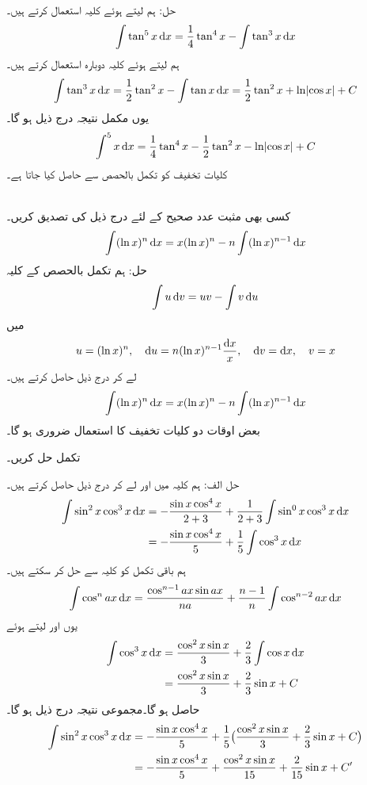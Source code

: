 حل:\quad
ہم  لیتے ہوئے کلیہ  استعمال کرتے ہیں۔
\begin{align*}
\int\tan^5x\dif x=\frac{1}{4}\tan^4x-\int\tan^3x\dif x
\end{align*}
ہم  لیتے ہوئے  کلیہ  دوبارہ استعمال کرتے ہیں۔
\begin{align*}
\int\tan^3x\dif x=\frac{1}{2}\tan^2x-\int \tan x\dif x=\frac{1}{2}\tan^2x+\ln\abs{\cos x}+C
\end{align*}
یوں مکمل نتیجہ درج ذیل ہو گا۔
\begin{align*}
\int^5x \dif x=\frac{1}{4}\tan^4x-\frac{1}{2}\tan^2x-\ln\abs{\cos x}+C
\end{align*}
کلیات تخفیف کو تکمل بالحصص سے حاصل کیا جاتا ہے۔

\\
کسی بھی مثبت عدد صحیح  کے لئے درج ذیل کی تصدیق کریں۔
\begin{align*}
\int (\ln x)^n\dif x=x(\ln x)^n-n\int (\ln x)^{n-1}\dif x
\end{align*}
حل:\quad
ہم تکمل بالحصص کے کلیہ
\begin{align*}
\int u\dif v=uv-\int v\dif u
\end{align*}
میں
\begin{align*}
u=(\ln x)^n,\quad \dif u=n(\ln x)^{n-1}\frac{\dif x}{x},\quad \dif v=\dif x,\quad v=x
\end{align*}
لے کر درج ذیل حاصل کرتے ہیں۔
\begin{align*}
\int (\ln x)^n\dif x=x(\ln x)^n-n\int (\ln x)^{n-1}\dif x
\end{align*}
بعض اوقات دو کلیات تخفیف کا استعمال ضروری ہو گا۔

تکمل  حل کریں۔

حل الف:\quad
ہم کلیہ  میں  اور  لے کر درج ذیل حاصل کرتے ہیں۔
\begin{align*}
\int \sin^2x\cos^3x\dif x&=-\frac{\sin x\cos^4x}{2+3}+\frac{1}{2+3}\int\sin^0x\cos^3x\dif x\\
&=-\frac{\sin x\cos^4x}{5}+\frac{1}{5}\int\cos^3x\dif x
\end{align*}
ہم باقی تکمل کو کلیہ  سے حل کر سکتے ہیں۔
\begin{align*}
\int\cos^nax\dif x=\frac{\cos^{n-1}ax\sin ax}{na}+\frac{n-1}{n}\int\cos^{n-2}ax\dif x
\end{align*}
یوں  اور  لیتے ہوئے
 \begin{align*}
\int\cos^3x\dif x&=\frac{\cos^2x\sin x}{3}+\frac{2}{3}\int\cos x\dif x\\
&=\frac{\cos^2x\sin x}{3}+\frac{2}{3}\sin x+C
\end{align*}
حاصل ہو گا۔مجموعی نتیجہ درج ذیل ہو گا۔
\begin{align*}
\int\sin^2x\cos^3x\dif x &=-\frac{\sin x\cos^4x}{5}+\frac{1}{5}\big(\frac{\cos^2x\sin x}{3}+\frac{2}{3}\sin x+C\big)\\
&=-\frac{\sin x\cos^4 x}{5}+\frac{\cos^2x\sin x}{15}+\frac{2}{15}\sin x+C'
\end{align*}

